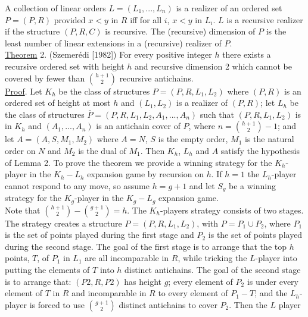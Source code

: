 \documentclass[twoside]{article}
\begin{document}
A collection of linear orders $L = (L_1,..., L_n)$    is a realizer of an ordered set   $P = (P, R)$   provided   $x<y$ in $R$   iff for all $i$, $x<y$ in $L_i$.   $L$   is a recursive   realizer if the structure  $(P,R,C)$ is recursive.    The (recursive) dimension of   $P$   is the least number of linear extensions in a (recursive) realizer of   $P$.\\
\newline
\underline{Theorem} 2.    (Szemer\'{e}di [1982])     For every positive integer   $h$  there exists a
recursive ordered set with height   $h$   and recursive dimension 2 which cannot
be covered by fewer than $\binom{h+1}{2}$	recursive antichains.\\
\newline
\underline{Proof}.    Let $K_h$	be the class of structures   $P = (P,R,L_1,L_2)$   where   $(P,R)$ is
an ordered set of height at most $h$   and  $(L_1, L_2)$   is a realizer of   $(P,R)$; let
$L_h$   be the class of structures $\bar{P} = (P,R,L_1,L_2,A_1,...,A_n)$   such that
$(P,R,L_1,L_2)$   is in	$K_h$ and   $(A_1,...,A_n)$ is an antichain cover of   $P$, where
$n = \binom{h+1}{2}-1$; and let $A = (A,S,M_1,M_2)$ where $A = N$, $S$ is the empty order, $M_1$
is the natural order on   $N$   and	$M_2$ is the dual of  $M_1$.   Then   $K_h$, $L_h$ and
$A$   satisfy the hypothesis of Lemma 2.   To prove the theorem we provide a winning strategy for the   $K_h$-player in the  $K_h - L_h$   expansion game by recursion on   $h$.    If   $h=1$    the   $L_h$-player cannot respond to any move, so
assume $h = g+1$ and   let  $S_g$     be a winning strategy for the   $K_g$-player in the $K_g - L_g$   expansion game.\\
Note that	$\binom{h+1}{2}	- \binom{g+1}{2} = h$. The   $K_h$-players     strategy consists of two
stages.    The strategy creates a structure   $P = (P,R,L_1,L_2)$, with   $P = P_1 \cup P_2$, where   $P_1$ is the set of points played during the first stage and   $P_2$   is the set of points played during the second stage.   
The goal of the first stage is to arrange that the top   $h$   points, $T$, of   $P_1$   in   $L_1$   are all incomparable in $R$, while tricking the   $L$-player into putting the elements of   $T$   into $h$ distinct antichains.   
The goal of the second stage is to arrange that: $(P2,R,P2)$   has height   $g$; every element of   $P_2$   is under every element
of $T$ in   $R$   and incomparable in   $R$  to every element of   $P_1 - T$;   and the $L_h$-player
\newpage
%
%
is forced to use $\binom{g+1}{2}$	distinct antichains to cover $P_2$.	Then the   $L$ player
\end{document}
